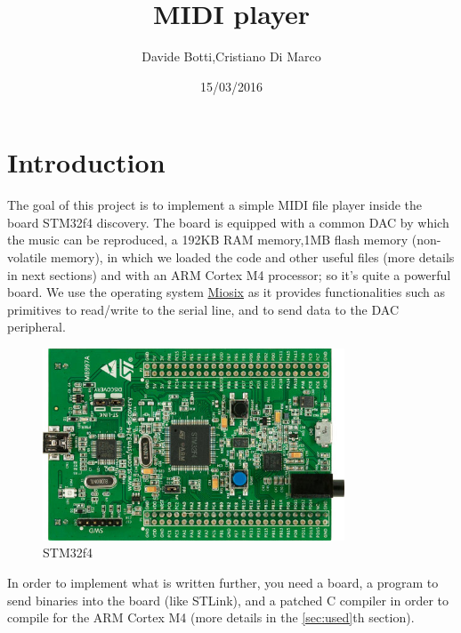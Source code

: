 \documentclass[12pt]{article}
\title{MIDI player}
\date{15/03/2016}
\author{Davide Botti,Cristiano Di Marco}
\begin{document}
\maketitle
{}
\pagestyle{fancy}
\fancyhead{}
\fancyfoot{}
\fancyfoot[R]{\thepage}
\newpage
{}
\tableofcontents

\newpage
\section{Introduction} \label{sec:intro}
 The goal of this project is to implement a simple MIDI file player inside the board STM32f4 discovery. The board is equipped with a common DAC by which the music can be reproduced, a 192KB RAM memory,1MB flash memory (non-volatile memory), in which we loaded the code and other useful files (more details in next sections) and with an ARM Cortex M4 processor; so it's quite a powerful board. We use the operating system \href{https://miosix.org/}{Miosix} as it provides functionalities such as primitives to read/write to the serial line, and to send data to the DAC peripheral.\newline
 \begin{figure}[H]
 	\includegraphics[width=0.8\textwidth]{STM32F4-Discovery-Board.jpg}
 	\caption{STM32f4}
 	\label{fig:STM32f4Discovery}
 \end{figure}
In order to implement what is written further, you need a board, a program to send binaries into the board (like STLink), and a patched C compiler in order to compile for the ARM Cortex M4 (more details in the \ref{sec:used}th section).
\newpage
\end{document}
